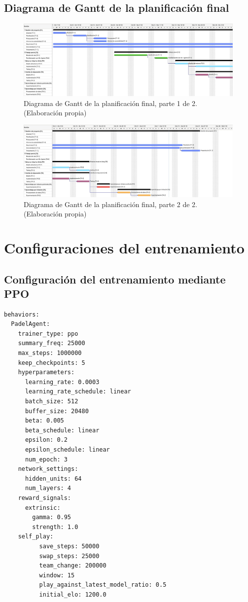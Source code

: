 \section{Diagrama de Gantt de la planificación final}\label{appendix:b}

\begin{figure}[H]
\centering
\includegraphics[width=\textwidth]{figures/gantter1-final.jpg}
\caption[Diagrama de Gantt de la planificación final, parte 1 de 2]{Diagrama de Gantt de la planificación final, parte 1 de 2. (Elaboración propia)}
\label{fig:gantter1-final}
\end{figure}

\begin{figure}[H]
\centering
\includegraphics[width=\textwidth]{figures/gantter2-final.jpg}
\caption[Diagrama de Gantt de la planificación final, parte 2 de 2]{Diagrama de Gantt de la planificación final, parte 2 de 2. (Elaboración propia)}
\label{fig:gantter2-fial}
\end{figure}

\chapter{Configuraciones del entrenamiento}
\section{Configuración del entrenamiento mediante PPO} \label{appendix:config-file-ppo}

\begin{verbatim}
behaviors:
  PadelAgent:
    trainer_type: ppo
    summary_freq: 25000
    max_steps: 1000000
    keep_checkpoints: 5
    hyperparameters:
      learning_rate: 0.0003
      learning_rate_schedule: linear
      batch_size: 512
      buffer_size: 20480
      beta: 0.005
      beta_schedule: linear
      epsilon: 0.2
      epsilon_schedule: linear
      num_epoch: 3
    network_settings:
      hidden_units: 64
      num_layers: 4
    reward_signals:
      extrinsic:
        gamma: 0.95
        strength: 1.0
    self_play:
          save_steps: 50000
          swap_steps: 25000
          team_change: 200000
          window: 15
          play_against_latest_model_ratio: 0.5
          initial_elo: 1200.0
\end{verbatim}


